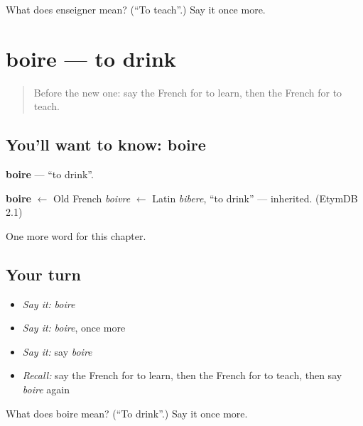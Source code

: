 \begin{tcolorbox}[breakable,colback=teal!4,colframe=teal!35!black,title={Before you move on}]
What does enseigner mean? (\textquotedblleft{}To teach\textquotedblright{}.) Say it once more.
\end{tcolorbox}
\section[boire]{boire — to drink}

\label{lesson:FR-C61-boire}



\begin{quote}
Before the new one: say the French for to learn, then the French for to teach.
\end{quote}

\subsection*{You'll want to know: boire}
\textbf{boire} — \textquotedblleft{}to drink\textquotedblright{}.

\begin{cousinweb}
\textbf{boire} $\leftarrow$ Old French \emph{boivre} $\leftarrow$ Latin \emph{bibere}, \textquotedblleft{}to drink\textquotedblright{} — inherited. (EtymDB 2.1)
\end{cousinweb}

\begin{grammarlens}[title={What you've built}]
One more word for this chapter.
\end{grammarlens}

\subsection*{Your turn}
\begin{itemize}
\raggedright
  \item \emph{Say it:} \emph{boire}
  \item \emph{Say it:} \emph{boire}, once more
  \item \emph{Say it:} say \emph{boire}
  \item \emph{Recall:} say the French for to learn, then the French for to teach, then say \emph{boire} again
\end{itemize}

\begin{tcolorbox}[breakable,colback=teal!4,colframe=teal!35!black,title={Before you move on}]
What does boire mean? (\textquotedblleft{}To drink\textquotedblright{}.) Say it once more.
\end{tcolorbox}
